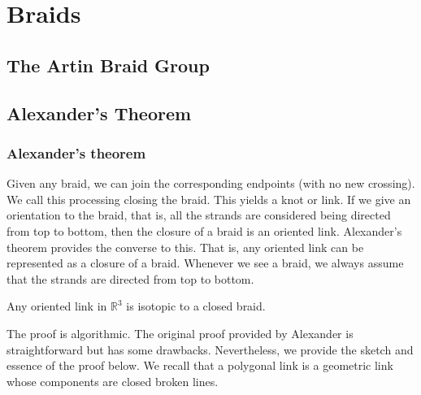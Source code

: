 \chapter{Braids}

\section{The Artin Braid Group}

\section{Alexander's Theorem}
\label{Alex}

\subsection{Alexander's theorem}

Given any braid, we can join the corresponding endpoints (with no new crossing). We call this processing closing the braid. This yields a knot or link. If we give an orientation to the braid, that is, all the strands are considered being directed from top to bottom, then the closure of a braid is an oriented link. Alexander's theorem provides the converse to this. That is, any oriented link can be represented as a closure of a braid. Whenever we see a braid, we always assume that the strands are directed from top to bottom.

\begin{theorem}[Alexander]
Any oriented link in $\mathbb{R}^3$ is isotopic to a closed braid.
\end{theorem}

The proof is algorithmic. The original proof provided by Alexander is straightforward but has some drawbacks. Nevertheless, we provide the sketch and essence of the proof below. We recall that a polygonal link is a geometric link whose components are closed broken lines.

